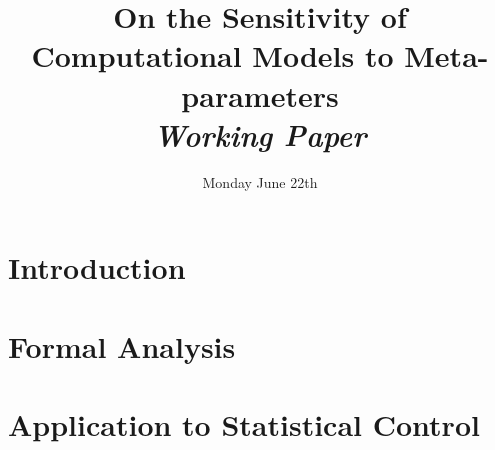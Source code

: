 


\title{On the Sensitivity of Computational Models to Meta-parameters\bigskip\\
\textit{Working Paper}
}
\author{}
\date{Monday June 22th}


\maketitle

\justify


\begin{abstract}

\end{abstract}


\section{Introduction}




\section{Formal Analysis}




\section{Application to Statistical Control}



















